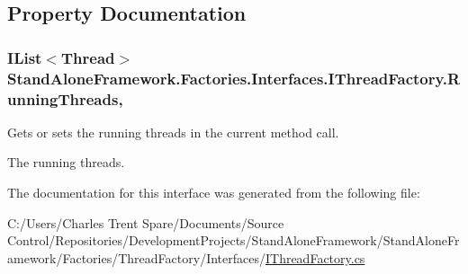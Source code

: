 \subsection{Property Documentation}
\hypertarget{interface_stand_alone_framework_1_1_factories_1_1_interfaces_1_1_i_thread_factory_a51adc616b01dc8db654da67f200fa394}{
\subsubsection[{Running\+Threads}]{\setlength{\rightskip}{0pt plus 5cm}I\+List$<$Thread$>$ Stand\+Alone\+Framework.\+Factories.\+Interfaces.\+I\+Thread\+Factory.\+Running\+Threads\hspace{0.3cm}{\ttfamily [get]}, {\ttfamily [set]}}}\label{interface_stand_alone_framework_1_1_factories_1_1_interfaces_1_1_i_thread_factory_a51adc616b01dc8db654da67f200fa394}


Gets or sets the running threads in the current method call. 

The running threads.

The documentation for this interface was generated from the following file\+:\begin{DoxyCompactItemize}
\item 
C\+:/\+Users/\+Charles Trent Spare/\+Documents/\+Source Control/\+Repositories/\+Development\+Projects/\+Stand\+Alone\+Framework/\+Stand\+Alone\+Framework/\+Factories/\+Thread\+Factory/\+Interfaces/\hyperlink{_i_thread_factory_8cs}{I\+Thread\+Factory.\+cs}\end{DoxyCompactItemize}
